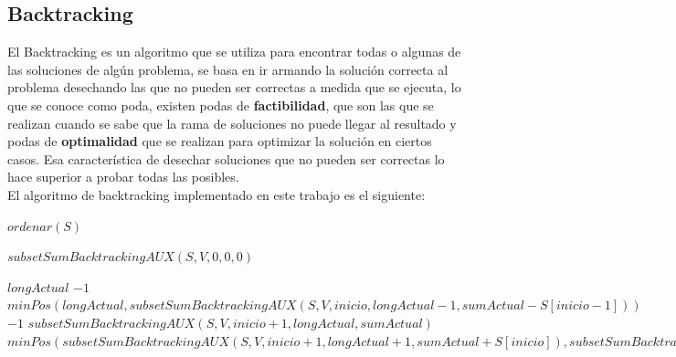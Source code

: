 \documentclass[a4paper]{article}
\begin{document}
\subsection{Backtracking}
El Backtracking es un algoritmo que se utiliza para encontrar todas o algunas de las soluciones de alg\'un problema, se basa en ir armando la soluci\'on correcta al problema desechando las que no pueden ser correctas a medida que se ejecuta, lo que se conoce como poda, existen podas de \textbf{factibilidad}, que son las que se realizan cuando se sabe que la rama de soluciones no puede llegar al resultado y podas de \textbf{optimalidad} que se realizan para optimizar la solución en ciertos casos.
Esa característica de desechar soluciones que no pueden ser correctas lo hace superior a probar todas las posibles.
\\
El algoritmo de backtracking implementado en este trabajo es el siguiente:

\begin{algorithm}
\begin{algorithmic}
		\State $ordenar(S)$ 
		
		\State \Return $subsetSumBacktrackingAUX(S, V, 0, 0, 0)$
	\EndProcedure
\end{algorithmic}
\end{algorithm}

\begin{algorithm}
\begin{algorithmic}
				\State \Return $longActual$
			\Else
				\State \Return $-1$
			\EndIf
		\Else
				\State \Return $minPos(longActual,subsetSumBacktrackingAUX(S,V,inicio,longActual-1,sumActual-S[inicio-1]))$
				\State \Return $-1$
				\State \Return $subsetSumBacktrackingAUX(S, V, inicio + 1, longActual, sumActual)$
			\Else
				\State \Return $minPos(subsetSumBacktrackingAUX(S,V,inicio+1, longActual+1, sumActual + S[inicio]), subsetSumBacktrackingAUX(S,V,inicio+1, longActual, sumActual))$
			\EndIf
		\EndIf
	\EndProcedure
\end{algorithmic}
\end{algorithm}
\end{document}
